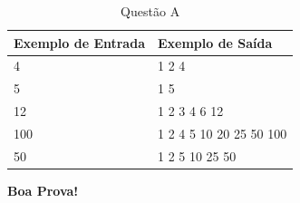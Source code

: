 \documentclass[a4paper, 12pt]{article}
\begin{document}
\begin{table}[H]
\centering
\begin{tabular}{|l|l|}
\hline
\textbf{Exemplo de Entrada} & \textbf{Exemplo de Saída} \\ \hline
4                           & 1 2 4                     \\ \hline
5                           & 1 5                       \\ \hline
12                          & 1 2 3 4 6 12              \\ \hline
100                         & 1 2 4 5 10 20 25 50 100   \\ \hline
50                          & 1 2 5 10 25 50            \\ \hline
\end{tabular}
\caption{Questão A}
\end{table}
\flushright
\textbf{\Large Boa Prova!}
\end{document}
